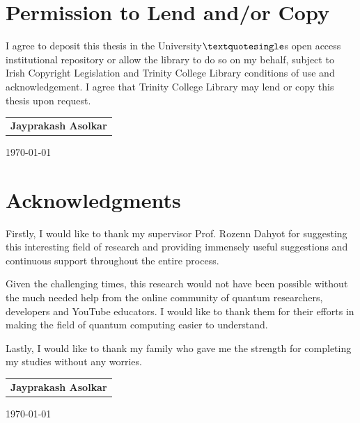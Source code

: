 \documentclass[english,a4paper,11pt,oneside,onecolumn]{book}
\begin{document}
\chapter*{Permission to Lend and/or Copy}

\noindent I agree to deposit this thesis in the University$\textquotesingle$s open access institutional repository or
allow the library to do so on my behalf, subject to Irish Copyright Legislation and
Trinity College Library conditions of use and acknowledgement. I agree that Trinity College Library may lend or copy this thesis upon request.

\vspace{3cm}
\begin{flushright}

\begin{tabular}{l}
\hline
\textbf{\textsf{\large Jayprakash Asolkar}}\\
\end{tabular}

\vspace{0.5cm}

\today
\end{flushright}

\chapter{Acknowledgments}
Firstly, I would like to thank my supervisor Prof. Rozenn Dahyot for suggesting this interesting field of research and providing immensely useful suggestions and continuous support throughout the entire process. 

Given the challenging times, this research would not have been possible without the much needed help from the online community of quantum researchers, developers and YouTube educators. I would like to thank them for their efforts in making the field of quantum computing easier to understand.

Lastly, I would like to thank my family who gave me the strength for completing my studies without any worries. 

\vspace{3cm}
\begin{flushright}

\begin{tabular}{l}
\hline
\textbf{\textsf{\large Jayprakash Asolkar}}\\
\end{tabular}

\vspace{0.5cm}

\today
\end{flushright}
\end{document}
